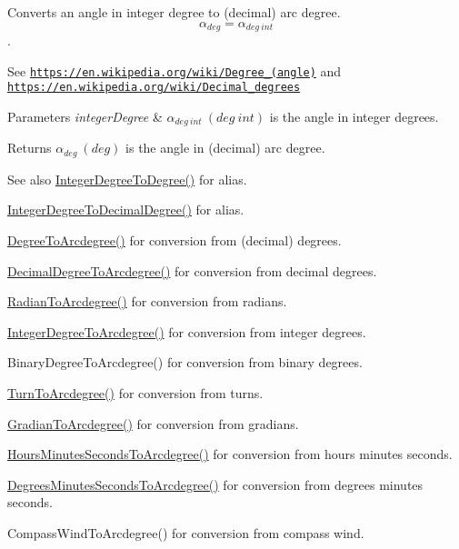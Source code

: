 Converts an angle in integer degree to (decimal) arc degree. \[\alpha_{deg}=\alpha_{deg\ int}\]. 

See \href{https://en.wikipedia.org/wiki/Degree_(angle)}{\tt https\+://en.\+wikipedia.\+org/wiki/\+Degree\+\_\+(angle)} and \href{https://en.wikipedia.org/wiki/Decimal_degrees}{\tt https\+://en.\+wikipedia.\+org/wiki/\+Decimal\+\_\+degrees} 
\begin{DoxyParams}{Parameters}
{\em integer\+Degree} & $\alpha_{deg\ int}\ (deg\ int)$ is the angle in integer degrees. \\
\hline
\end{DoxyParams}
\begin{DoxyReturn}{Returns}
$\alpha_{deg}\ (deg)$ is the angle in (decimal) arc degree. 
\end{DoxyReturn}
\begin{DoxySeeAlso}{See also}
\mbox{\hyperlink{group___e_g_x_math-_angle_conversions-_integer_degree_gaa9b63c6095fd7f8809fcfa2ba1e62235}{Integer\+Degree\+To\+Degree()}} for alias. 

\mbox{\hyperlink{group___e_g_x_math-_angle_conversions-_integer_degree_gac219c3198508ba984d8d81d22831b27d}{Integer\+Degree\+To\+Decimal\+Degree()}} for alias. 

\mbox{\hyperlink{group___e_g_x_math-_angle_conversions-_degree_gac1b5f3b68f66c77a6df4ceef842c9b19}{Degree\+To\+Arcdegree()}} for conversion from (decimal) degrees. 

\mbox{\hyperlink{group___e_g_x_math-_angle_conversions-_decimal_degree_gacdd463fcabffeb598ebda65b012ce743}{Decimal\+Degree\+To\+Arcdegree()}} for conversion from decimal degrees. 

\mbox{\hyperlink{group___e_g_x_math-_angle_conversions-_radian_ga3dfdc97357cc07f8379976bbc08f9852}{Radian\+To\+Arcdegree()}} for conversion from radians. 

\mbox{\hyperlink{group___e_g_x_math-_angle_conversions-_integer_degree_gaf633d0b82bfb7586ce86ffbcf78d8f7a}{Integer\+Degree\+To\+Arcdegree()}} for conversion from integer degrees. 

Binary\+Degree\+To\+Arcdegree() for conversion from binary degrees. 

\mbox{\hyperlink{group___e_g_x_math-_angle_conversions-_turn_ga7bdc3a81ce316dd47b1a3179489fa195}{Turn\+To\+Arcdegree()}} for conversion from turns. 

\mbox{\hyperlink{group___e_g_x_math-_angle_conversions-_gradian_gacd0b1797f2460944dcbc541a855ec21c}{Gradian\+To\+Arcdegree()}} for conversion from gradians. 

\mbox{\hyperlink{group___e_g_x_math-_angle_conversions-_hours_minutes_seconds_ga3c38143df47da88534ddbd13726748e2}{Hours\+Minutes\+Seconds\+To\+Arcdegree()}} for conversion from hours minutes seconds. 

\mbox{\hyperlink{group___e_g_x_math-_angle_conversions-_degrees_minutes_seconds_ga71fd0a3b9238a3a4fde150802938dee8}{Degrees\+Minutes\+Seconds\+To\+Arcdegree()}} for conversion from degrees minutes seconds. 

Compass\+Wind\+To\+Arcdegree() for conversion from compass wind. 
\end{DoxySeeAlso}
